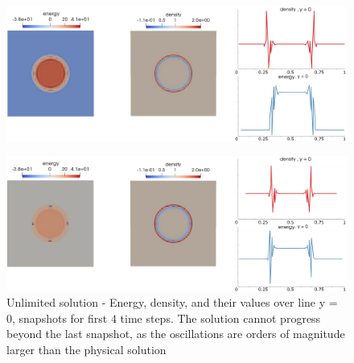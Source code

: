 	\begin{figure}[H]
		\begin{center}
			\includegraphics[width=\textwidth]{img/limit/nl4.jpg}
		\end{center}
	\end{figure}\vspace{-8mm}
	\begin{figure}[H]
		\begin{center}
			\includegraphics[width=\textwidth]{img/limit/nl6.jpg}		
			\caption{Unlimited solution - Energy, density, and their values over line y = 0, snapshots for first $4$ time steps. The solution cannot progress beyond the last snapshot, as the oscillations are orders of magnitude larger than the physical solution}
		\end{center}
	\end{figure}
	
